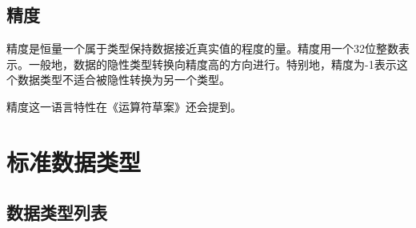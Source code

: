 \documentclass[11pt]{ctexrep}
\begin{document}
\subsection{精度}

精度是恒量一个属于类型保持数据接近真实值的程度的量。精度用一个32位整数表示。一般地，数据的隐性类型转换向精度高的方向进行。特别地，精度为-1表示这个数据类型不适合被隐性转换为另一个类型。

精度这一语言特性在《运算符草案》还会提到。

\section{标准数据类型}
\subsection{数据类型列表}
\end{document}
